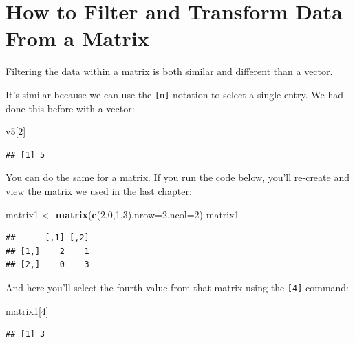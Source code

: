 \documentclass[
]{book}
\newenvironment{Shaded}{\begin{snugshade}}{\end{snugshade}}
\newcommand{\DataTypeTok}[1]{\textcolor[rgb]{0.13,0.29,0.53}{#1}}
\newcommand{\DecValTok}[1]{\textcolor[rgb]{0.00,0.00,0.81}{#1}}
\newcommand{\KeywordTok}[1]{\textcolor[rgb]{0.13,0.29,0.53}{\textbf{#1}}}
\newcommand{\NormalTok}[1]{#1}
\newcommand{\StringTok}[1]{\textcolor[rgb]{0.31,0.60,0.02}{#1}}
\begin{document}
\hypertarget{how-to-filter-and-transform-data-from-a-matrix}{%
\section{How to Filter and Transform Data From a Matrix}\label{how-to-filter-and-transform-data-from-a-matrix}}

Filtering the data within a matrix is both similar and different than a vector.

It's similar because we can use the \texttt{{[}n{]}} notation to select a single entry. We had done this before with a vector:

\begin{Shaded}
\begin{Highlighting}[]
\NormalTok{v5[}\DecValTok{2}\NormalTok{]}
\end{Highlighting}
\end{Shaded}

\begin{verbatim}
## [1] 5
\end{verbatim}

You can do the same for a matrix. If you run the code below, you'll re-create and view the matrix we used in the last chapter:

\begin{Shaded}
\begin{Highlighting}[]
\NormalTok{matrix1 <-}\StringTok{ }\KeywordTok{matrix}\NormalTok{(}\KeywordTok{c}\NormalTok{(}\DecValTok{2}\NormalTok{,}\DecValTok{0}\NormalTok{,}\DecValTok{1}\NormalTok{,}\DecValTok{3}\NormalTok{),}\DataTypeTok{nrow=}\DecValTok{2}\NormalTok{,}\DataTypeTok{ncol=}\DecValTok{2}\NormalTok{)}
\NormalTok{matrix1}
\end{Highlighting}
\end{Shaded}

\begin{verbatim}
##      [,1] [,2]
## [1,]    2    1
## [2,]    0    3
\end{verbatim}

And here you'll select the fourth value from that matrix using the \texttt{{[}4{]}} command:

\begin{Shaded}
\begin{Highlighting}[]
\NormalTok{matrix1[}\DecValTok{4}\NormalTok{]}
\end{Highlighting}
\end{Shaded}

\begin{verbatim}
## [1] 3
\end{verbatim}
\end{document}
